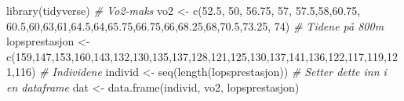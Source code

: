 \documentclass[
]{book}
\newenvironment{Shaded}{\begin{snugshade}}{\end{snugshade}}
\newcommand{\CommentTok}[1]{\textcolor[rgb]{0.56,0.35,0.01}{\textit{#1}}}
\newcommand{\DecValTok}[1]{\textcolor[rgb]{0.00,0.00,0.81}{#1}}
\newcommand{\FloatTok}[1]{\textcolor[rgb]{0.00,0.00,0.81}{#1}}
\newcommand{\FunctionTok}[1]{\textcolor[rgb]{0.00,0.00,0.00}{#1}}
\newcommand{\NormalTok}[1]{#1}
\newcommand{\OtherTok}[1]{\textcolor[rgb]{0.56,0.35,0.01}{#1}}
\begin{document}
\begin{Shaded}
\begin{Highlighting}[]
\FunctionTok{library}\NormalTok{(tidyverse)}
\CommentTok{\# Vo2{-}maks}
\NormalTok{vo2 }\OtherTok{\textless{}{-}} \FunctionTok{c}\NormalTok{(}\FloatTok{52.5}\NormalTok{, }\DecValTok{50}\NormalTok{, }\FloatTok{56.75}\NormalTok{, }\DecValTok{57}\NormalTok{, }\FloatTok{57.5}\NormalTok{,}\DecValTok{58}\NormalTok{,}\FloatTok{60.75}\NormalTok{, }\FloatTok{60.5}\NormalTok{,}\DecValTok{60}\NormalTok{,}\DecValTok{63}\NormalTok{,}\DecValTok{61}\NormalTok{,}\FloatTok{64.5}\NormalTok{,}\DecValTok{64}\NormalTok{,}\FloatTok{65.75}\NormalTok{,}\FloatTok{66.75}\NormalTok{,}\DecValTok{66}\NormalTok{,}\FloatTok{68.25}\NormalTok{,}\DecValTok{68}\NormalTok{,}\FloatTok{70.5}\NormalTok{,}\FloatTok{73.25}\NormalTok{, }\DecValTok{74}\NormalTok{)}
\CommentTok{\# Tidene på 800m}
\NormalTok{lopsprestasjon }\OtherTok{\textless{}{-}} \FunctionTok{c}\NormalTok{(}\DecValTok{159}\NormalTok{,}\DecValTok{147}\NormalTok{,}\DecValTok{153}\NormalTok{,}\DecValTok{160}\NormalTok{,}\DecValTok{143}\NormalTok{,}\DecValTok{132}\NormalTok{,}\DecValTok{130}\NormalTok{,}\DecValTok{135}\NormalTok{,}\DecValTok{137}\NormalTok{,}\DecValTok{128}\NormalTok{,}\DecValTok{121}\NormalTok{,}\DecValTok{125}\NormalTok{,}\DecValTok{130}\NormalTok{,}\DecValTok{137}\NormalTok{,}\DecValTok{141}\NormalTok{,}\DecValTok{136}\NormalTok{,}\DecValTok{122}\NormalTok{,}\DecValTok{117}\NormalTok{,}\DecValTok{119}\NormalTok{,}\DecValTok{121}\NormalTok{,}\DecValTok{116}\NormalTok{)}
\CommentTok{\# Individene}
\NormalTok{individ }\OtherTok{\textless{}{-}} \FunctionTok{seq}\NormalTok{(}\FunctionTok{length}\NormalTok{(lopsprestasjon))}
\CommentTok{\# Setter dette inn i en dataframe}
\NormalTok{dat }\OtherTok{\textless{}{-}} \FunctionTok{data.frame}\NormalTok{(individ, vo2, lopsprestasjon)}
\end{Highlighting}
\end{Shaded}
\end{document}
